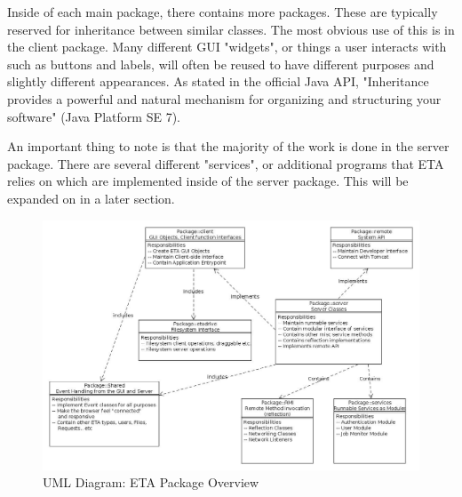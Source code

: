 \documentclass[12pt,a4paper]{article}
\begin{document}
Inside of each main package, there contains more packages. These are typically reserved for inheritance between similar classes. The most obvious use of this is in the client package. Many different GUI "widgets", or things a user interacts with such as buttons and labels, will often be reused to have different purposes and slightly different appearances. As stated in the official Java API, "Inheritance provides a powerful and natural mechanism for organizing and structuring your software" (Java Platform SE 7).

An important thing to note is that the majority of the work is done in the server package. There are several different "services", or additional programs that ETA relies on which are implemented inside of the server package. This will be expanded on in a later section.
\begin{figure}
\includegraphics[width=1\textwidth]{ETAPackageOverview.jpg}
\caption{UML Diagram: ETA Package Overview}
\label{fig:ETAPackageOverview}

\end{figure}

\setlength{\parindent}{0.5in}
 
\end{document}
